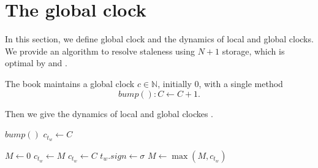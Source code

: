 \section{The global clock} \label{sec:global-clock}
In this section, we define global clock and the dynamics of local and global clocks. We provide an algorithm to resolve staleness using $N+1$ storage, which is optimal by  and .
\begin{definition} \label{def:clock}
    The book maintains a global clock $c\in\mathbb{N}$, initially $0$, with a single method
    \begin{equation*}
        \mathit{bump}()\colon C\gets C+1.
    \end{equation*}
\end{definition}
Then we give the dynamics of local and global clockes .
\begin{algorithm}[htbp!]
\caption{Sweep on side $\sigma$}\label{alg:sweep}
\begin{algorithmic}[1]
\State $\mathit{bump}()$
    \State $c_{t_w}\gets C$ \label{ln:bump}
\EndFor
\end{algorithmic}
\end{algorithm}

\begin{algorithm}[htbp!]
\caption{Placement at tick $t$ on side $\sigma$}\label{alg:place}
    \begin{algorithmic}[1]
        \State $M\gets 0$
                \State $c_{t_w}\gets M$ \label{ln:reset}
                \State $c_{t_w}\gets C$ \label{ln:wrongside}
            \EndIf
            \State $t_w.\mathit{sign}\gets\sigma$ \label{ln:setsign}
            \State $M\gets\max(M,c_{t_w})$
        \EndFor
    \end{algorithmic}
\end{algorithm}

